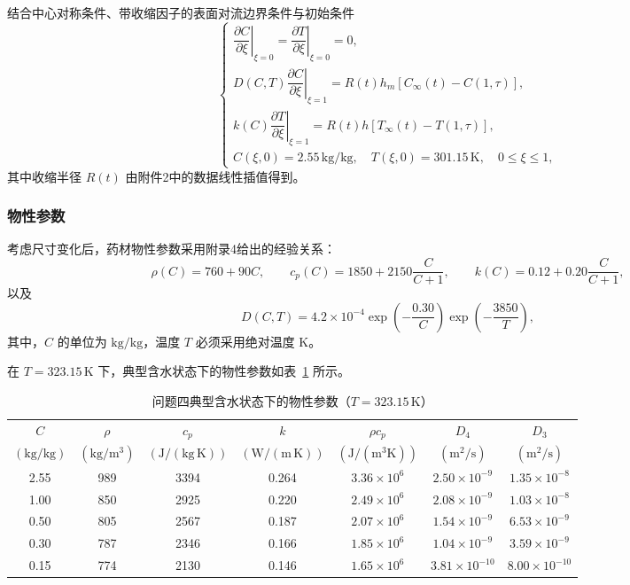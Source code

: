 \documentclass[12pt,a4paper]{article}
\begin{document}
结合中心对称条件、带收缩因子的表面对流边界条件与初始条件
\begin{equation}
\begin{cases}
\left.\dfrac{\partial C}{\partial\xi}\right|_{\xi=0}
=\left.\dfrac{\partial T}{\partial\xi}\right|_{\xi=0}=0,\\[3mm]
D(C,T)\left.\dfrac{\partial C}{\partial\xi}\right|_{\xi=1}
=R(t)h_m\left[C_\infty(t)-C(1,\tau)\right],\\[3mm]
k(C)\left.\dfrac{\partial T}{\partial\xi}\right|_{\xi=1}
=R(t)h\left[T_\infty(t)-T(1,\tau)\right],\\[3mm]
C(\xi,0)=2.55\,\mathrm{kg/kg},\quad
T(\xi,0)=301.15\,\mathrm{K},\quad
0\le\xi\le1,
\end{cases}
\label{eq:model4_bc}
\end{equation}
其中收缩半径 \(R(t)\) 由附件2中的数据线性插值得到。

\subsubsection{物性参数}

考虑尺寸变化后，药材物性参数采用附录4给出的经验关系：
$$\rho(C)=760+90C,
\qquad
c_p(C)
=
1850+2150\frac{C}{C+1},
\qquad
k(C)
=
0.12+0.20\frac{C}{C+1},
\label{eq:props4}$$
以及
$$D(C,T)
=
4.2\times10^{-4}
\exp\left(-\frac{0.30}{C}\right)
\exp\left(-\frac{3850}{T}\right),
\label{eq:D4}$$
其中，\(C\) 的单位为 \(\mathrm{kg/kg}\)，温度 \(T\) 必须采用绝对温度 \(\mathrm{K}\)。

在 \(T=323.15\,\mathrm{K}\) 下，典型含水状态下的物性参数如表~\ref{tab:property4} 所示。

\begin{table}[htbp]
\centering
\caption{问题四典型含水状态下的物性参数（\(T=323.15\,\mathrm{K}\)）\cite{liu2022}\cite{dasilva2014}}
\label{tab:property4}
\renewcommand{\arraystretch}{1.2}
\footnotesize
\begin{tabular}{ccccccc}
\toprule
\(C\) & \(\rho\) & \(c_p\) & \(k\) & \(\rho c_p\) & \(D_4\) & \(D_3\) \\
\((\mathrm{kg/kg})\) & \((\mathrm{kg/m^3})\) & \((\mathrm{J/(kg\,K)})\) & \((\mathrm{W/(m\,K)})\) & \((\mathrm{J/(m^3K)})\) & \((\mathrm{m^2/s})\) & \((\mathrm{m^2/s})\) \\
\midrule
2.55 & 989 & 3394 & 0.264 & \(3.36\times10^{6}\) & \(2.50\times10^{-9}\) & \(1.35\times10^{-8}\) \\
1.00 & 850 & 2925 & 0.220 & \(2.49\times10^{6}\) & \(2.08\times10^{-9}\) & \(1.03\times10^{-8}\) \\
0.50 & 805 & 2567 & 0.187 & \(2.07\times10^{6}\) & \(1.54\times10^{-9}\) & \(6.53\times10^{-9}\) \\
0.30 & 787 & 2346 & 0.166 & \(1.85\times10^{6}\) & \(1.04\times10^{-9}\) & \(3.59\times10^{-9}\) \\
0.15 & 774 & 2130 & 0.146 & \(1.65\times10^{6}\) & \(3.81\times10^{-10}\) & \(8.00\times10^{-10}\) \\
\bottomrule
\end{tabular}
\end{table}
\end{document}
